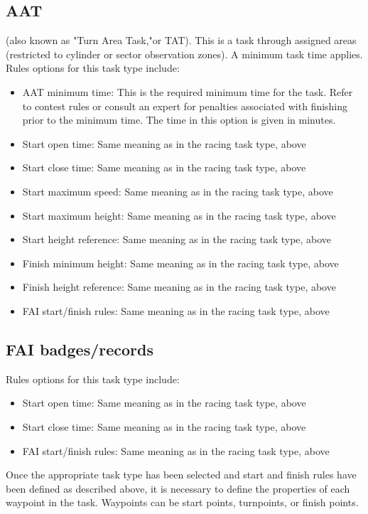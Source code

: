 \subsection*{AAT}
(also known as "Turn Area Task,"or TAT).  This is a task through assigned 
areas (restricted to cylinder or sector observation zones).  A minimum task time 
applies.  Rules options for this task type include:
  \begin{itemize}
  \item AAT minimum time:  This is the required minimum time for the task.  Refer 
    to contest rules or consult an expert for penalties associated with finishing 
    prior to the minimum time.  The time in this option is given in minutes.
  \item Start open time: Same meaning as in the racing task type, above
  \item Start close time: Same meaning as in the racing task type, above
  \item Start maximum speed: Same meaning as in the racing task type, above
  \item Start maximum height: Same meaning as in the racing task type, above
  \item Start height reference: Same meaning as in the racing task type, above
  \item Finish minimum height: Same meaning as in the racing task type, above
  \item Finish height reference: Same meaning as in the racing task type, above
  \item FAI start/finish rules: Same meaning as in the racing task type, above
 \end{itemize}
\subsection*{FAI badges/records}
Rules options for this task type include:
  \begin{itemize}
  \item Start open time: Same meaning as in the racing task type, above
  \item Start close time: Same meaning as in the racing task type, above
  \item FAI start/finish rules: Same meaning as in the racing task type, above
  \end{itemize}

Once the appropriate task type has been selected and start and finish rules have 
been defined as described above, it is necessary to define the properties of each 
waypoint in the task.  Waypoints can be start points, turnpoints, or finish points.

